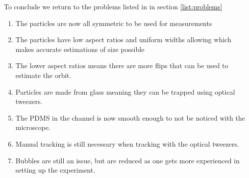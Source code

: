 To conclude we return to the problems listed in in section \ref{list:problems} 

\begin{enumerate} \label{list:solutions}
	\item The particles are now all symmetric to be used for measurements
	\item The particles have low aspect ratios and uniform widths allowing which makes accurate estimations of size possible
	\item The lower aspect ratios means there are more flips that can be used to estimate the orbit.
	\item Particles are made from glass meaning they can be trapped using optical tweezers.
	\item The PDMS in the channel is now smooth enough to not be noticed with the microscope.
	\item Manual tracking is still necessary when tracking with the optical tweezers.
	\item Bubbles are still an issue, but are reduced as one gets more experienced in setting up the experiment.
\end{enumerate}
